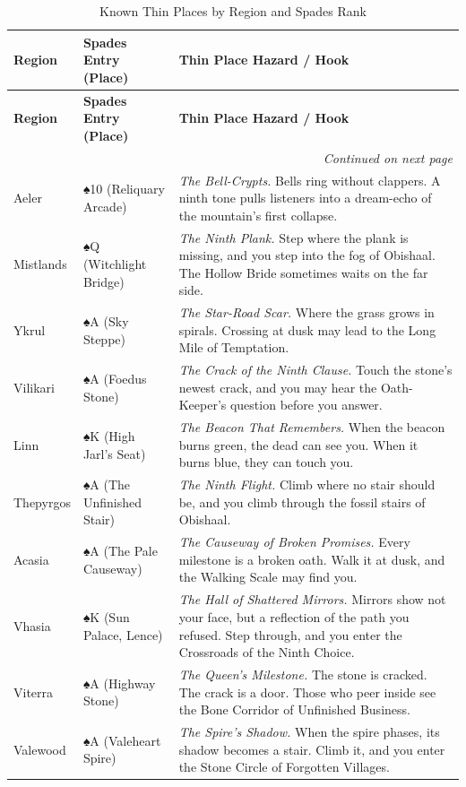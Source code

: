 \begin{longtable}{p{} p{} p{}}
\caption{Known Thin Places by Region and Spades Rank}\\
\hline
\textbf{Region} & \textbf{Spades Entry (Place)} & \textbf{Thin Place Hazard / Hook} \\
\hline
\endfirsthead
\hline
\textbf{Region} & \textbf{Spades Entry (Place)} & \textbf{Thin Place Hazard / Hook} \\
\hline
\endhead
\hline
\multicolumn{3}{r}{\textit{Continued on next page}} \\
\endfoot
\hline
\endlastfoot

Aeler & ♠10 (Reliquary Arcade) & \textit{The Bell-Crypts.} Bells ring without clappers. A ninth tone pulls listeners into a dream-echo of the mountain's first collapse. \\
Mistlands & ♠Q (Witchlight Bridge) & \textit{The Ninth Plank.} Step where the plank is missing, and you step into the fog of Obishaal. The Hollow Bride sometimes waits on the far side. \\
Ykrul & ♠A (Sky Steppe) & \textit{The Star-Road Scar.} Where the grass grows in spirals. Crossing at dusk may lead to the Long Mile of Temptation. \\
Vilikari & ♠A (Foedus Stone) & \textit{The Crack of the Ninth Clause.} Touch the stone's newest crack, and you may hear the Oath-Keeper's question before you answer. \\
Linn & ♠K (High Jarl's Seat) & \textit{The Beacon That Remembers.} When the beacon burns green, the dead can see you. When it burns blue, they can touch you. \\
Thepyrgos & ♠A (The Unfinished Stair) & \textit{The Ninth Flight.} Climb where no stair should be, and you climb through the fossil stairs of Obishaal. \\
Acasia & ♠A (The Pale Causeway) & \textit{The Causeway of Broken Promises.} Every milestone is a broken oath. Walk it at dusk, and the Walking Scale may find you. \\
Vhasia & ♠K (Sun Palace, Lence) & \textit{The Hall of Shattered Mirrors.} Mirrors show not your face, but a reflection of the path you refused. Step through, and you enter the Crossroads of the Ninth Choice. \\
Viterra & ♠A (Highway Stone) & \textit{The Queen's Milestone.} The stone is cracked. The crack is a door. Those who peer inside see the Bone Corridor of Unfinished Business. \\
Valewood & ♠A (Valeheart Spire) & \textit{The Spire's Shadow.} When the spire phases, its shadow becomes a stair. Climb it, and you enter the Stone Circle of Forgotten Villages. \\

\end{longtable}
